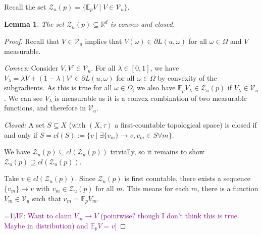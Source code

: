 \documentclass{article}
\newcommand{\Comments}{1}
\newcommand{\mynote}[2]{\ifnum\Comments=1\textcolor{#1}{#2}\fi}
\newcommand{\mytodo}[2]{\ifnum\Comments=1%
	\todo[linecolor=#1!80!black,backgroundcolor=#1,bordercolor=#1!80!black]{#2}\fi}
\newcommand{\jessie}[1]{\mynote{purple}{[JF: #1]}}
\newcommand{\jessiet}[1]{\mytodo{purple!20!white}{JF: #1}}
\newcommand{\reals}{\mathbb{R}}
\newcommand{\E}{\mathbb{E}}
\newcommand{\V}{\mathcal{V}}
\newcommand{\Z}{\mathcal{Z}}
\newtheorem{lemma}{Lemma}
\begin{document}
Recall the set $\Z_u(p) = \{\E_p V \mid V \in \V_u\}$.
\begin{lemma}
	The set $\Z_u(p) \subseteq \reals^d$ is convex and closed.
\end{lemma}
\begin{proof}
	Recall that $V \in \V_u$ implies that $V(\omega) \in \partial L(u,\omega)$ for all $\omega \in \Omega$ and $V$ measurable.
	
	\emph{Convex: }
	Consider $V, V' \in \V_u$.
	For all $\lambda \in [0,1]$, we have $V_\lambda = \lambda V + (1-\lambda) V' \in \partial L(u,\omega)$ for all $\omega \in \Omega$ by convexity of the subgradients.
	As this is true for all $\omega \in \Omega$, we also have $\E_p V_\lambda \in \Z_u(p)$ if $V_\lambda \in \V_u$.
	We can see $V_\lambda$ is measurable as it is a convex combination of two measurable functions, and therefore in $\V_u$.
	
	\emph{Closed: } A set $S \subseteq X$ (with $(X,\tau)$ a first-countable topological space) is closed if and only if $S = cl(S) := \{v \mid \exists \{v_m\} \to v, v_m \in S \forall m\}$.
	
	We have $\Z_u(p) \subseteq cl(\Z_u(p))$ trivially, so it remains to show $\Z_u(p) \supseteq cl(\Z_u(p))$.
	
	Take $v \in cl(\Z_u(p))$.
	Since $\Z_u(p)$ is first countable, there exists a sequence $\{v_m\} \to v$ with $v_m \in \Z_u(p)$ for all $m$.
	This means for each $m$, there is a function $V_m \in \V_u$ such that $v_m = \E_p V_m$.

	\jessie{Want to claim $V_m \to V$ (pointwise? though I don't think this is true.  Maybe in distribution) and $\E_p V = v$}	
	
\end{proof}





\end{document}
